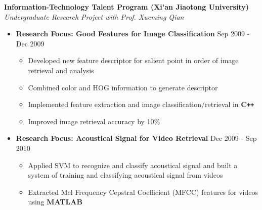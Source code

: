 \documentclass[10pt]{article}
\newenvironment{outerlist}[1][\enskip\textbullet]%
        {\begin{itemize}[#1,leftmargin=*]}{\end{itemize}%
         \vspace{-1.2\baselineskip}}
\newenvironment{innerlist}[1][\enskip\textbullet]%
        {\begin{itemize}[#1,leftmargin=*,parsep=0pt,itemsep=0pt,topsep=0pt,partopsep=0pt]}
        {\end{itemize}}
\begin{document}
\textbf{Information-Technology Talent Program (Xi'an Jiaotong University) } \\
\emph{Undergraduate Research Project with Prof. Xueming Qian}
\begin{outerlist}
\vspace{-.1in}
\item[] \textbf{Research Focus: Good Features for Image Classification } \hfill {Sep 2009 - Dec  2009}
        \begin{innerlist}
\vspace{-.05in}
        \item Developed new feature descriptor for salient point in order of image retrieval and analysis
	\item Combined color and HOG information to generate descriptor
	\item Implemented feature extraction and image classification/retrieval in \textbf{C\texttt{++}}
	\item Improved image retrieval accuracy by 10$\%$
        \end{innerlist}
        \item[] \textbf{Research Focus: Acoustical Signal for Video Retrieval } \hfill {Dec 2009 - Sep 2010}
        \begin{innerlist}
\vspace{-.05in}
        \item Applied SVM to recognize and classify acoustical signal and built a system of training and classifying acoustical signal from videos
        \item Extracted Mel Frequency Cepstral Coefficient (MFCC) features for videos using \textbf{MATLAB}
        \end{innerlist}
\vspace{.15in}
\end{outerlist}
\end{document}
